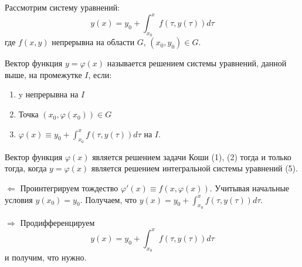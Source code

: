 \documentclass[document.tex]{subfiles}
\begin{document}
Рассмотрим систему уравнений:
$$y(x) = y_0 + \int_{x_0}^x f(\tau, y(\tau))d\tau$$
где $f(x, y)$ непрерывна на области $G$, $(x_0, y_0) \in G$.

\begin{definition}
Вектор функция $y = \varphi(x)$ называется решением системы уравнений, данной выше, на промежутке $I$, если:
\begin{enumerate}
\item y непрерывна на $I$
\item Точка $(x_0, \varphi(x_0)) \in G$
\item $\varphi(x) \equiv y_0 + \int_{x_0}^x f(\tau, y(\tau))d\tau$ на $I$.
\end{enumerate}
\end{definition}

\begin{Lemma}[об эквивалентности]
Вектор функция $\varphi(x)$ является решением задачи Коши (1), (2) тогда и только тогда, когда $y = \varphi(x)$ является решением интегральной системы уравнений (5).
\end{Lemma}
\begin{Proof}
$\Leftarrow$ Проинтегрируем тождество $\varphi'(x) \equiv f(x, \varphi(x))$. Учитывая начальные условия $y(x_0) = y_0$. Получаем, что $y(x) = y_0 + \int_{x_0}^x f(\tau, y(\tau)) d\tau$.

$\Rightarrow$ Продифференцируем 
$$y(x) = y_0 + \int_{x_0}^x f(\tau, y(\tau))d\tau$$
и получим, что нужно.
\end{Proof}
\end{document}
